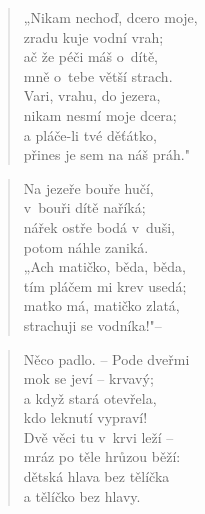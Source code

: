 \begin{verse}
„Nikam nechoď, dcero moje, \\
zradu kuje vodní vrah; \\
ač že péči máš o~dítě, \\
mně o~tebe větší strach. \\
Vari, vrahu, do jezera, \\
nikam nesmí moje dcera; \\
a pláče-li tvé děťátko, \\
přines je sem na náš práh."
\end{verse}

\begin{verse}
Na jezeře bouře hučí, \\
v~bouři dítě naříká; \\
nářek ostře bodá v~duši, \\
potom náhle zaniká. \\
„Ach matičko, běda, běda, \\
tím pláčem mi krev usedá; \\
matko má, matičko zlatá, \\
strachuji se vodníka!"--
\end{verse}

\begin{verse}
Něco padlo. -- Pode dveřmi \\
mok se jeví -- krvavý; \\
a když stará otevřela, \\
kdo leknutí vypraví! \\
Dvě věci tu v~krvi leží -- \\
mráz po těle hrůzou běží: \\
dětská hlava bez tělíčka \\
a tělíčko bez hlavy.
\end{verse}
